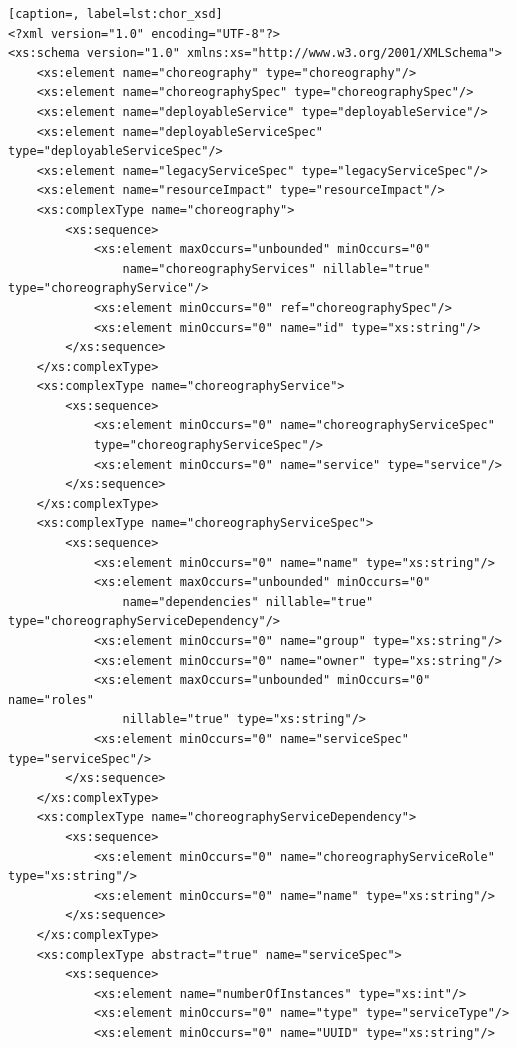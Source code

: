 \documentclass[a4paper, 10pt]{article}
\begin{document}
{\footnotesize

\lstset{language=XML}

\begin{lstlisting}[caption=, label=lst:chor_xsd]
<?xml version="1.0" encoding="UTF-8"?>
<xs:schema version="1.0" xmlns:xs="http://www.w3.org/2001/XMLSchema">
    <xs:element name="choreography" type="choreography"/>
    <xs:element name="choreographySpec" type="choreographySpec"/>
    <xs:element name="deployableService" type="deployableService"/>
    <xs:element name="deployableServiceSpec" type="deployableServiceSpec"/>
    <xs:element name="legacyServiceSpec" type="legacyServiceSpec"/>
    <xs:element name="resourceImpact" type="resourceImpact"/>
    <xs:complexType name="choreography">
        <xs:sequence>
            <xs:element maxOccurs="unbounded" minOccurs="0"
                name="choreographyServices" nillable="true" type="choreographyService"/>
            <xs:element minOccurs="0" ref="choreographySpec"/>
            <xs:element minOccurs="0" name="id" type="xs:string"/>
        </xs:sequence>
    </xs:complexType>
    <xs:complexType name="choreographyService">
        <xs:sequence>
            <xs:element minOccurs="0" name="choreographyServiceSpec" 
            type="choreographyServiceSpec"/>
            <xs:element minOccurs="0" name="service" type="service"/>
        </xs:sequence>
    </xs:complexType>
    <xs:complexType name="choreographyServiceSpec">
        <xs:sequence>
            <xs:element minOccurs="0" name="name" type="xs:string"/>
            <xs:element maxOccurs="unbounded" minOccurs="0"
                name="dependencies" nillable="true" type="choreographyServiceDependency"/>
            <xs:element minOccurs="0" name="group" type="xs:string"/>
            <xs:element minOccurs="0" name="owner" type="xs:string"/>
            <xs:element maxOccurs="unbounded" minOccurs="0" name="roles"
                nillable="true" type="xs:string"/>
            <xs:element minOccurs="0" name="serviceSpec" type="serviceSpec"/>
        </xs:sequence>
    </xs:complexType>
    <xs:complexType name="choreographyServiceDependency">
        <xs:sequence>
            <xs:element minOccurs="0" name="choreographyServiceRole" type="xs:string"/>
            <xs:element minOccurs="0" name="name" type="xs:string"/>
        </xs:sequence>
    </xs:complexType>
    <xs:complexType abstract="true" name="serviceSpec">
        <xs:sequence>
            <xs:element name="numberOfInstances" type="xs:int"/>
            <xs:element minOccurs="0" name="type" type="serviceType"/>
            <xs:element minOccurs="0" name="UUID" type="xs:string"/>

\end{lstlisting}}
\end{document}
